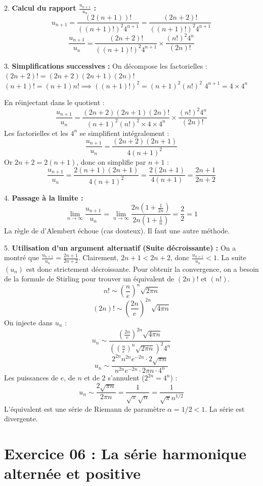 \documentclass[12pt, a4paper]{article}
\begin{document}
2. \textbf{Calcul du rapport $\frac{u_{n+1}}{u_n}$ :}
   $$u_{n+1} = \frac{(2(n+1))!}{((n+1)!)^2 4^{n+1}} = \frac{(2n+2)!}{((n+1)!)^2 4^{n+1}}$$
   $$\frac{u_{n+1}}{u_n} = \frac{(2n+2)!}{((n+1)!)^2 4^{n+1}} \times \frac{(n!)^2 4^n}{(2n)!}$$

3. \textbf{Simplifications successives :}
   On décompose les factorielles :
   $(2n+2)! = (2n+2)(2n+1)(2n)!$
   $(n+1)! = (n+1)n! \implies ((n+1)!)^2 = (n+1)^2(n!)^2$
   $4^{n+1} = 4 \times 4^n$

   En réinjectant dans le quotient :
   $$\frac{u_{n+1}}{u_n} = \frac{(2n+2)(2n+1)(2n)!}{(n+1)^2(n!)^2 \times 4 \times 4^n} \times \frac{(n!)^2 4^n}{(2n)!}$$
   Les factorielles et les $4^n$ se simplifient intégralement :
   $$\frac{u_{n+1}}{u_n} = \frac{(2n+2)(2n+1)}{4(n+1)^2}$$
   Or $2n+2 = 2(n+1)$, donc on simplifie par $n+1$ :
   $$\frac{u_{n+1}}{u_n} = \frac{2(n+1)(2n+1)}{4(n+1)^2} = \frac{2(2n+1)}{4(n+1)} = \frac{2n+1}{2n+2}$$

4. \textbf{Passage à la limite :}
   $$\lim_{n \to \infty} \frac{u_{n+1}}{u_n} = \lim_{n \to \infty} \frac{2n(1 + \frac{1}{2n})}{2n(1 + \frac{1}{n})} = \frac{2}{2} = 1$$
   La règle de d'Alembert échoue (cas douteux). Il faut une autre méthode.

5. \textbf{Utilisation d'un argument alternatif (Suite décroissante) :}
   On a montré que $\frac{u_{n+1}}{u_n} = \frac{2n+1}{2n+2}$.
   Clairement, $2n+1 < 2n+2$, donc $\frac{u_{n+1}}{u_n} < 1$.
   La suite $(u_n)$ est donc strictement décroissante.
   Pour obtenir la convergence, on a besoin de la formule de Stirling pour trouver un équivalent de $(2n)!$ et $(n!)$.
   $$n! \sim \left(\frac{n}{e}\right)^n \sqrt{2\pi n}$$
   $$(2n)! \sim \left(\frac{2n}{e}\right)^{2n} \sqrt{4\pi n}$$
   On injecte dans $u_n$ :
   $$u_n \sim \frac{\left(\frac{2n}{e}\right)^{2n} \sqrt{4\pi n}}{\left(\left(\frac{n}{e}\right)^n \sqrt{2\pi n}\right)^2 4^n}$$
   $$u_n \sim \frac{2^{2n} n^{2n} e^{-2n} \cdot 2\sqrt{\pi n}}{n^{2n} e^{-2n} \cdot 2\pi n \cdot 4^n}$$
   Les puissances de $e$, de $n$ et de $2$ s'annulent ($2^{2n} = 4^n$) :
   $$u_n \sim \frac{2\sqrt{\pi n}}{2\pi n} = \frac{1}{\sqrt{\pi} \sqrt{n}} = \frac{1}{\sqrt{\pi} n^{1/2}}$$
   L'équivalent est une série de Riemann de paramètre $\alpha = 1/2 < 1$. La série est divergente.


\section*{Exercice 06 : La série harmonique alternée et positive}
\end{document}
